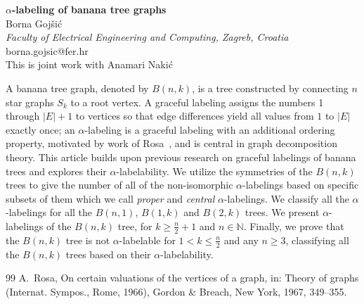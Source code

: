 \documentclass[a4paper,14pt]{article}
\begin{document}
\sloppy
\renewcommand{\refname}{\small{References}}
\thispagestyle{fancy}
\fancyhead{}
\fancyfoot{}
\renewcommand{\footrulewidth}{0.1 mm}

\begin{center}
  \textbf{$\alpha$-labeling of banana tree graphs}\\
  \vspace{\baselineskip}
  Borna Gojšić\\
  \emph{Faculty of Electrical Engineering and Computing, Zagreb, Croatia}\\
  borna.gojsic@fer.hr\\
  \vspace{\baselineskip}
  This is joint work with Anamari Nakić\\
\end{center}
\vspace{\baselineskip}

A banana tree graph, denoted by $B(n, k)$, is a tree constructed by connecting $n$ star graphs $S_k$ to a root vertex. A graceful labeling assigns the numbers 1 through $|E| + 1$ to vertices so that edge differences yield all values from $1$ to $|E|$ exactly once; an $\alpha$-labeling is a graceful labeling with an additional ordering property, motivated by work of Rosa~\cite{1}, and is central in graph decomposition theory. This article builds upon previous research on graceful labelings of banana trees and explores their $\alpha$-labelability. We utilize the symmetries of the $B(n,k)$ trees to give the number of all of the non-isomorphic $\alpha$-labelings based on specific subsets of them which we call {\it proper} and {\it central} $\alpha$-labelings. We classify all the $\alpha$-labelings for all the $B(n, 1)$, $B(1, k)$ and $B(2,k)$ trees. We present $\alpha$-labelings of the $B(n,k)$ tree, for $k \geq \frac{n}{2} + 1$ and $n \in \mathbb{N}$. Finally, we prove that the $B(n, k)$ tree is not $\alpha$-labelable for $1 < k \leq \frac{n}{2}$ and any $n \ge 3$, classifying all the $B(n, k)$ trees based on their $\alpha$-labelability.

\begin{thebibliography}{99}
   \small{A.~Rosa, On certain valuations of the vertices of a graph, in: Theory of graphs (Internat. Sympos., Rome, 1966), Gordon \& Breach, New York, 1967, 349--355.}
\end{thebibliography}
\end{document}
